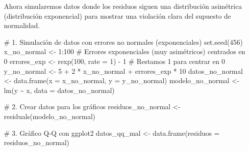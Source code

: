 \documentclass[
  letterpaper,
  DIV=11,
  numbers=noendperiod]{scrreprt}
\newenvironment{Shaded}{\begin{snugshade}}{\end{snugshade}}
\newcommand{\AttributeTok}[1]{\textcolor[rgb]{0.40,0.45,0.13}{#1}}
\newcommand{\CommentTok}[1]{\textcolor[rgb]{0.37,0.37,0.37}{#1}}
\newcommand{\DecValTok}[1]{\textcolor[rgb]{0.68,0.00,0.00}{#1}}
\newcommand{\FunctionTok}[1]{\textcolor[rgb]{0.28,0.35,0.67}{#1}}
\newcommand{\NormalTok}[1]{\textcolor[rgb]{0.00,0.23,0.31}{#1}}
\newcommand{\OtherTok}[1]{\textcolor[rgb]{0.00,0.23,0.31}{#1}}
\newcommand{\SpecialCharTok}[1]{\textcolor[rgb]{0.37,0.37,0.37}{#1}}
\begin{document}
\begin{tcolorbox}[enhanced jigsaw, leftrule=.75mm, breakable, colbacktitle=quarto-callout-tip-color!10!white, bottomrule=.15mm, colframe=quarto-callout-tip-color-frame, toprule=.15mm, colback=white, coltitle=black, bottomtitle=1mm, left=2mm, title=\textcolor{quarto-callout-tip-color}{\faLightbulb}\hspace{0.5em}{Contraejemplo: Violación del supuesto de normalidad}, opacityback=0, arc=.35mm, opacitybacktitle=0.6, toptitle=1mm, titlerule=0mm, rightrule=.15mm]

Ahora simularemos datos donde los residuos siguen una distribución
asimétrica (distribución exponencial) para mostrar una violación clara
del supuesto de normalidad.

\begin{Shaded}
\begin{Highlighting}[]
\CommentTok{\# 1. Simulación de datos con errores no normales (exponenciales)}
\FunctionTok{set.seed}\NormalTok{(}\DecValTok{456}\NormalTok{)}
\NormalTok{x\_no\_normal }\OtherTok{\textless{}{-}} \DecValTok{1}\SpecialCharTok{:}\DecValTok{100}
\CommentTok{\# Errores exponenciales (muy asimétricos) centrados en 0}
\NormalTok{errores\_exp }\OtherTok{\textless{}{-}} \FunctionTok{rexp}\NormalTok{(}\DecValTok{100}\NormalTok{, }\AttributeTok{rate =} \DecValTok{1}\NormalTok{) }\SpecialCharTok{{-}} \DecValTok{1}  \CommentTok{\# Restamos 1 para centrar en 0}
\NormalTok{y\_no\_normal }\OtherTok{\textless{}{-}} \DecValTok{5} \SpecialCharTok{+} \DecValTok{2} \SpecialCharTok{*}\NormalTok{ x\_no\_normal }\SpecialCharTok{+}\NormalTok{ errores\_exp }\SpecialCharTok{*} \DecValTok{10}
\NormalTok{datos\_no\_normal }\OtherTok{\textless{}{-}} \FunctionTok{data.frame}\NormalTok{(}\AttributeTok{x =}\NormalTok{ x\_no\_normal, }\AttributeTok{y =}\NormalTok{ y\_no\_normal)}
\NormalTok{modelo\_no\_normal }\OtherTok{\textless{}{-}} \FunctionTok{lm}\NormalTok{(y }\SpecialCharTok{\textasciitilde{}}\NormalTok{ x, }\AttributeTok{data =}\NormalTok{ datos\_no\_normal)}

\CommentTok{\# 2. Crear datos para los gráficos}
\NormalTok{residuos\_no\_normal }\OtherTok{\textless{}{-}} \FunctionTok{residuals}\NormalTok{(modelo\_no\_normal)}

\CommentTok{\# 3. Gráfico Q{-}Q con ggplot2}
\NormalTok{datos\_qq\_mal }\OtherTok{\textless{}{-}} \FunctionTok{data.frame}\NormalTok{(}\AttributeTok{residuos =}\NormalTok{ residuos\_no\_normal)}


\end{Highlighting}
\end{Shaded}
\end{tcolorbox}
\end{document}
